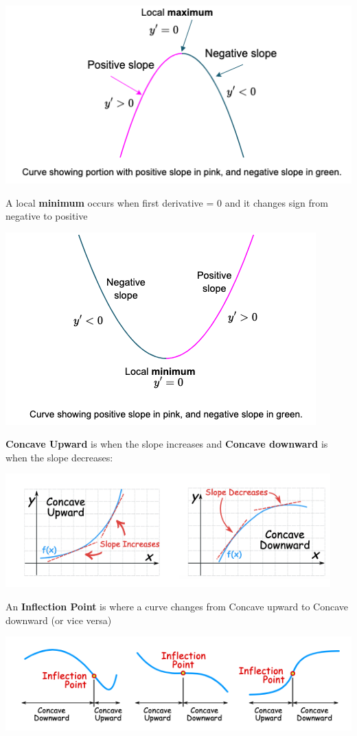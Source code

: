 \documentclass{book}
\begin{document}
	\includegraphics[scale=0.7]{localmaximum}
	
	A local \textbf{minimum} occurs when first derivative = 0 and it changes sign from negative to positive
	
	\includegraphics[scale=0.7]{localminimum}
	
	\textbf{Concave Upward} is when the slope increases and \textbf{Concave downward} is when the slope decreases:
	
	\includegraphics[scale=0.9]{concave1}
	
	An \textbf{Inflection Point} is where a curve changes from Concave upward to Concave downward (or vice versa)
	
	\includegraphics[scale=0.9]{inflection1}
	
\end{document}
